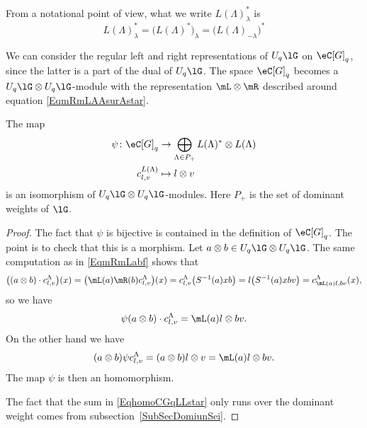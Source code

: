 From a notational point of view, what we write \( L(\Lambda)^*_{\lambda}\) is
\begin{equation}
	L(\Lambda)^*_{\lambda}=\big( L(\Lambda)^* \big)_{\lambda}=\big( L(\Lambda)_{-\lambda} \big)^*
\end{equation}

We can consider the regular left and right representations of \( U_q\lG\) on \( \eC[G]_q\), since the latter is a part of the dual of \( U_q\lG\). The space \( \eC[G]_q\) becomes a \( U_q\lG\otimes U_q\lG\)-module with the representation \( \mL\otimes \mR\) described around equation \eqref{EqmRmLAAsurAstar}.
\begin{proposition}
	The map
	\begin{equation}        \label{EqhomoCGqLLstar}
		\begin{aligned}
			\psi\colon \eC[G]_q  & \to \bigoplus_{\Lambda\in P_+}L(\Lambda)^*\otimes L(\Lambda) \\
			c^{L(\Lambda)}_{l,v} & \mapsto l\otimes v
		\end{aligned}
	\end{equation}
	is an isomorphism of \( U_q\lG\otimes U_q\lG\)-modules. Here \( P_+\) is the set of dominant weights of \( \lG\).
\end{proposition}

\begin{proof}
	The fact that \( \psi\) is bijective is contained in the definition of \( \eC[G]_q\). The point is to check that this is a morphism. Let \( a\otimes b\in U_q\lG\otimes U_q\lG\). The same computation as in \eqref{EqmRmLabf} shows that
	\begin{equation}
		\big( (a\otimes b)\cdot c^{\Lambda}_{l,v} \big)(x)=\big( \mL(a)\mR(b)c_{l,v}^{\Lambda} \big)(x)=c^{\Lambda}_{l,v}\big( S^{-1}(a)xb \big)=l\big( S^{-1}(a)xbv \big)=c^{\Lambda}_{\mL(a)l,bv}(x),
	\end{equation}
	so we have
	\begin{equation}
		\psi(a\otimes b)\cdot c_{l,v}^{\Lambda}=\mL(a)l\otimes bv.
	\end{equation}
	On the other hand we have
	\begin{equation}
		(a\otimes b)\psi c_{l,v}^{\Lambda}=(a\otimes b)l\otimes v=\mL(a)l\otimes bv.
	\end{equation}
	The map \( \psi\) is then an homomorphism.

	The fact that the sum in \eqref{EqhomoCGqLLstar} only runs over the dominant weight comes from subsection~\ref{SubSecDomiunSei}.
\end{proof}


